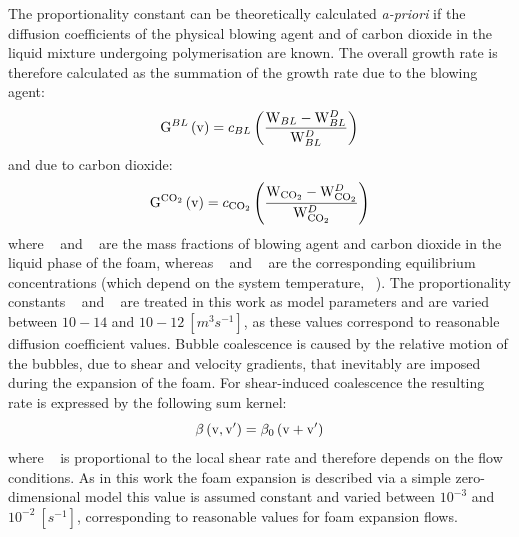 The proportionality constant can be theoretically calculated \emph{a-priori} if the diffusion coefficients of the physical blowing agent and of carbon dioxide in the liquid mixture undergoing polymerisation are known.  
The overall growth rate is therefore calculated as the summation of the growth rate due to the blowing agent:
\begin{equation}
    {\ensuremath{\mathrm{G}}^{\ensuremath{BL}}}\left( \mathrm{v} \right) =
    c_{BL} 
    \left(
        \frac{ \mathrm{W}_{BL} - \mathrm{W}^D_{BL} }{ \mathrm{W}^D_{BL} }
    \right)
\end{equation}
and due to carbon dioxide:
\begin{equation}
    {\ensuremath{\mathrm{G}}^{\ensuremath{\mathrm{C}\mathrm{O}_2}}}\left( \mathrm{v} \right) =
    c_{\mathrm{C}\mathrm{O}_2}
    \left(
        \frac{ \mathrm{W}_{\mathrm{C}\mathrm{O}_2} - \mathrm{W}^D_{\mathrm{C}\mathrm{O}_2} }{ \mathrm{W}^D_{\mathrm{C}\mathrm{O}_2} }
    \right)
\end{equation}
where {~\MassFractionLiquidBlowingAgent } and {~\MassFractionLiquidCarbonDiOxide} are the mass fractions of blowing agent and carbon dioxide in the liquid phase of the foam, whereas {~\EquilibriumMassFractionLiquidBlowingAgent} and {~\EquilibriumMassFractionLiquidCarbonDiOxide} are the corresponding equilibrium concentrations (which depend on the system temperature, {~\Temperature}). 
The proportionality constants {~\ModelGrowthRateConstantBlowingAgent} and {~\ModelGrowthRateConstantCarbonDiOxide} are treated in this work as model parameters and are varied between $10-14$ and $10-12\ [m^3 s^{-1}]$, as these values correspond to reasonable diffusion coefficient values.
Bubble coalescence is caused by the relative motion of the bubbles, due to shear and velocity gradients, that inevitably are imposed during the expansion of the foam. For shear-induced coalescence the resulting rate is expressed by the following sum kernel\cite{marchisio_and_fox_2013}:
\begin{equation}
    {\ensuremath{\beta}}\left( \mathrm{v}, \mathrm{v}' \right) = {\beta_0}\left(  \mathrm{v} + \mathrm{v}' \right)
\end{equation}
where {~\CoalescenceKernelConstant} is proportional to the local shear rate and therefore depends on the flow conditions. 
As in this work the foam expansion is described via a simple zero-dimensional model this value is assumed constant and varied between $10^{-3}$ and $10^{-2}\ [s^{-1}]$, corresponding to reasonable values for foam expansion flows.
